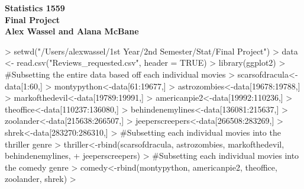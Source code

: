 \documentclass[12pt]{article}
\begin{document}




\begin{center}
\textbf{Statistics 1559} \\
\textbf{Final Project} \\ 
\textbf{Alex Wassel and Alana McBane} 
\end{center}

\vspace{12pt}
\noindent 
\begin{Schunk}
\begin{Sinput}
> setwd("/Users/alexwassel/1st Year/2nd Semester/Stat/Final Project")
> data <- read.csv("Reviews_requested.csv", header = TRUE)
> library(ggplot2)
> #Subsetting the entire data based off each individual movies 
> scarsofdracula<-data[1:60,]
> montypython<-data[61:19677,]
> astrozombies<-data[19678:19788,]
> markofthedevil<-data[19789:19991,]
> americanpie2<-data[19992:110236,]
> theoffice<-data[110237:136080,]
> behindenemylines<-data[136081:215637,]
> zoolander<-data[215638:266507,]
> jeeperscreepers<-data[266508:283269,]
> shrek<-data[283270:286310,]
> #Subsetting each individual movies into the thriller genre
> thriller<-rbind(scarsofdracula, astrozombies, markofthedevil, behindenemylines,
+                 jeeperscreepers)
> #Subsetting each individual movies into the comedy genre
> comedy<-rbind(montypython, americanpie2, theoffice, zoolander, shrek)
> 
\end{Sinput}
\end{Schunk}
\end{document}
